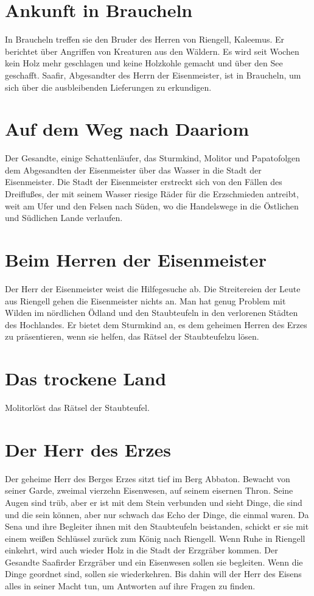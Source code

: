 \documentclass[12pt,a4paper,onecolumn,twoside,ngerman]{book}
\newcommand{\Molitor}{Molitor}
\newcommand{\Sena}{Sena}
\newcommand{\Sturmkind}{Sturmkind}
\newcommand{\Papato}{Papato}
\newcommand{\Schattenlaufer}{Schattenläufer}
\newcommand{\Rhingell}{Riengell}
\newcommand{\Kalemus}{Kaleemus}
\newcommand{\Dreifluss}{Dreifluß}
\newcommand{\Braucheln}{Braucheln}
\newcommand{\Eisenmeister}{Eisenmeister}
\newcommand{\Dariom}{Daariom}
\newcommand{\Abaton}{Abbaton}
\newcommand{\Safir}{Saafir}
\newcommand{\Staubteufel}{Staubteufel}
\begin{document}
\section{Ankunft in {\Braucheln}}
In {\Braucheln} treffen sie den Bruder des Herren von {\Rhingell}, {\Kalemus}. Er berichtet über Angriffen von Kreaturen aus den Wäldern. Es wird seit Wochen kein Holz mehr geschlagen und keine Holzkohle gemacht und über den See geschafft. {\Safir}, Abgesandter des Herrn der {\Eisenmeister}, ist in {\Braucheln}, um sich über die ausbleibenden Lieferungen zu erkundigen.

\section{Auf dem Weg nach \Dariom}
Der Gesandte, einige {\Schattenlaufer}, das {\Sturmkind}, {\Molitor} und \Papato folgen dem Abgesandten der {\Eisenmeister} über das Wasser in die Stadt der {\Eisenmeister}.\linebreak
Die Stadt der {\Eisenmeister} erstreckt sich von den Fällen des {\Dreifluss}es, der mit seinem Wasser riesige Räder für die Erzschmieden antreibt, weit am Ufer und den Felsen nach Süden, wo die Handelswege in die Östlichen und Südlichen Lande verlaufen.

\section{Beim Herren der {\Eisenmeister}}
Der Herr der {\Eisenmeister} weist die Hilfegesuche ab. Die Streitereien der Leute aus {\Rhingell}  gehen die {\Eisenmeister} nichts an. Man hat genug Problem mit Wilden im nördlichen Ödland und den {\Staubteufel}n in den verlorenen Städten des Hochlandes.\linebreak 
Er bietet dem {\Sturmkind} an, es dem geheimen Herren des Erzes zu präsentieren, wenn sie helfen, das Rätsel der \Staubteufel zu lösen.

\section{Das trockene Land}
{\Molitor}löst das Rätsel der {\Staubteufel}.

\section{Der Herr des Erzes}
Der geheime Herr des Berges Erzes sitzt tief im Berg {\Abaton}. Bewacht von seiner Garde, zweimal vierzehn Eisenwesen, auf seinem eisernen Thron. Seine Augen sind trüb, aber er ist mit dem Stein verbunden und sieht Dinge, die sind und die sein können, aber nur schwach das Echo der Dinge, die einmal waren.\linebreak
Da {\Sena} und ihre Begleiter ihnen mit den Staubteufeln beistanden, schickt er sie mit einem weißen Schlüssel zurück zum König nach {\Rhingell}. Wenn Ruhe in {\Rhingell} einkehrt, wird auch wieder Holz in die Stadt der Erzgräber kommen. Der Gesandte \Safir der Erzgräber und ein Eisenwesen sollen sie begleiten.\linebreak
Wenn die Dinge geordnet sind, sollen sie wiederkehren. Bis dahin will der Herr des Eisens alles in seiner Macht tun, um Antworten auf ihre Fragen zu finden.
\end{document}
